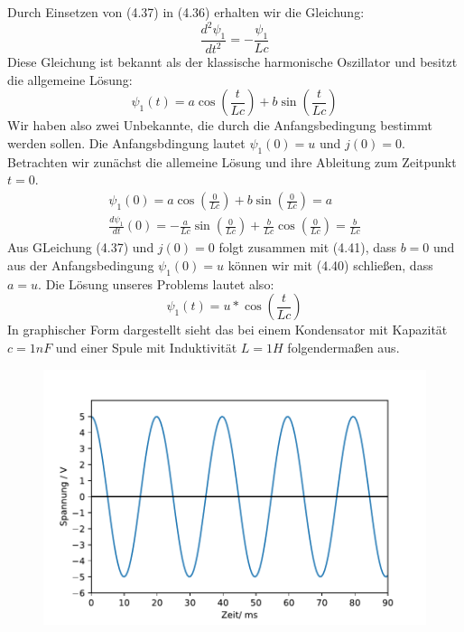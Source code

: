 \documentclass[11pt,a4paper,leqno]{report}
\numberwithin{equation}{chapter}
\begin{document}
Durch Einsetzen von (4.37) in (4.36) erhalten wir die Gleichung:
\begin{equation}
	\frac{d^2\psi_1}{dt^2} = -\frac{\psi_1}{Lc}
\end{equation}
Diese Gleichung ist bekannt als der klassische harmonische Oszillator und besitzt die allgemeine L\"osung:
\begin{equation}
	\psi_1(t) = a \cos(\frac{t}{Lc}) + b \sin(\frac{t}{Lc})
\end{equation}
Wir haben also zwei Unbekannte, die durch die Anfangsbedingung bestimmt werden sollen. Die Anfangsbdingung lautet $\psi_1(0) = u$ und $j(0) = 0$. Betrachten wir zun\"achst die allemeine L\"osung und ihre Ableitung zum Zeitpunkt $t=0$.
 \begin{align} 
\psi_1(0) = a \cos(\frac{0}{Lc}) + b \sin(\frac{0}{Lc}) = a\\
\frac{d\psi_1}{dt}(0) = -\frac{a}{Lc} \sin(\frac{0}{Lc}) + \frac{b}{Lc} \cos(\frac{0}{Lc}) = \frac{b}{Lc}
\end{align}
Aus GLeichung (4.37) und $j(0) = 0$ folgt zusammen mit (4.41), dass $b=0$ und aus der Anfangsbedingung $\psi_1(0) = u$ k\"onnen wir mit (4.40) schlie\ss{}en, dass $a=u$. Die L\"osung unseres Problems lautet also:
\begin{equation}
	\psi_1(t) = u * \cos(\frac{t}{Lc})
\end{equation}
In graphischer Form dargestellt sieht das bei einem Kondensator mit Kapazit\"at $c=1nF$ und einer Spule mit Induktivit\"at $L=1H$ folgenderma\ss{}en aus.
  \begin{figure}[H]
	\begin{center}
		\includegraphics[scale=0.75]{Bilder/harmonisch.pdf}
	\end{center}
\end{figure}
\end{document}

